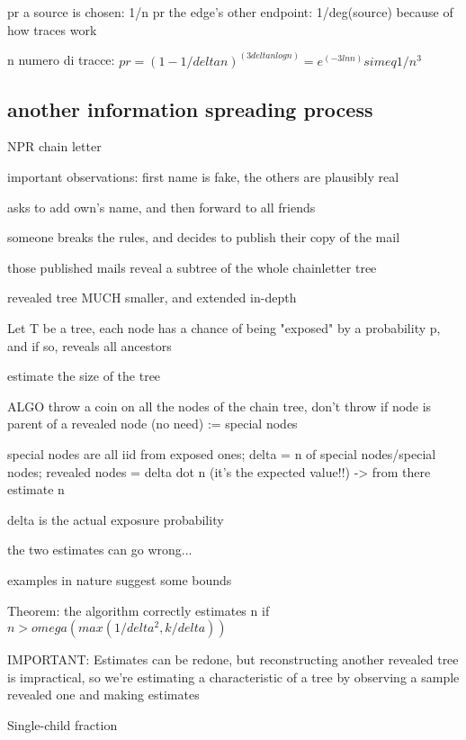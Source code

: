 \documentclass{report}
\begin{document}
	pr a source is chosen: 1/n
	pr the edge's other endpoint: 1/deg(source) because of how traces work
	
	n numero di tracce: $pr = (1-1/deltan)^(3deltanlogn) = e^(-3lnn) simeq 1/n^3$
	
	
	\subsection{another information spreading process}
	
	NPR chain letter
	
	important observations: first name is fake, the others are plausibly real
	
	asks to add own's name, and then forward to all friends
	
	
	someone breaks the rules, and decides to publish their copy of the mail
	
	those published mails reveal a subtree of the whole chainletter tree
	
	revealed tree MUCH smaller, and extended in-depth
	
	
	Let T be a tree, each node has a chance of being "exposed" by a probability p, and if so, reveals all ancestors
	
	estimate the size of the tree
	
	ALGO
	throw a coin on all the nodes of the chain tree, don't throw if node is parent of a revealed node (no need) := special nodes
	
	special nodes are all iid from exposed ones; delta = n of special nodes/special nodes; revealed nodes = delta dot n (it's the expected value!!) -> from there estimate n
	
	delta is the actual exposure probability
	
	the two estimates can go wrong...
	
	examples in nature suggest some bounds
	
	
	Theorem: the algorithm correctly estimates n if $n > omega(max(1/delta^2, k/delta))$
	
		
		IMPORTANT: Estimates can be redone, but reconstructing another revealed tree is impractical, so we're estimating a characteristic of  a tree by observing a sample revealed one and making estimates
	
	Single-child fraction
	
\end{document}
